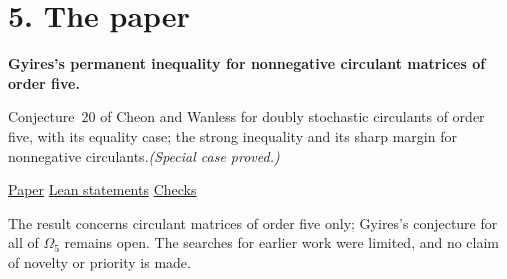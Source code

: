 \documentclass[11pt,a4paper]{article}
\begin{document}
\section*{5. The paper}
\textbf{Gyires's permanent inequality for nonnegative circulant matrices of order five.}\par
Conjecture~20 of Cheon and Wanless for doubly stochastic circulants of order five, with its equality case; the strong
inequality and its sharp margin for nonnegative circulants.\enspace\emph{(Special case proved.)}\par
{\footnotesize\href{https://github.com/dvgyl/gyires-circulant-5/blob/main/preprints/Gyires-inequality-for-circulants-of-order-five/paper.pdf}{Paper}%
\enspace\textperiodcentered\enspace
\href{https://github.com/dvgyl/gyires-circulant-5/blob/main/lean/Challenges/GyiresCirculant5.lean}{Lean statements}%
\enspace\textperiodcentered\enspace
\href{https://github.com/dvgyl/gyires-circulant-5/blob/main/verification/README.md}{Checks}\par}

The result concerns circulant matrices of order five only; Gyires's conjecture for all of $\Omega_5$ remains open. The
searches for earlier work were limited, and no claim of novelty or priority is made.
\end{document}
